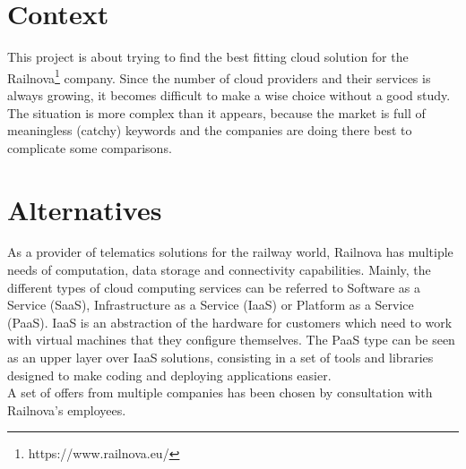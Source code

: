 \documentclass[a4paper,11pt]{article}
\begin{document}
\section{Context}
This project is about trying to find the best fitting cloud solution for the Railnova\footnote{https://www.railnova.eu/} company. Since the number of cloud providers and their services is always growing, it becomes difficult to make a wise choice without a good study. The situation is more complex than it appears, because the market is full of meaningless (catchy) keywords and the companies are doing there best to complicate some comparisons.


\section{Alternatives}
As a provider of telematics solutions for the railway world, Railnova has multiple needs of computation, data storage and connectivity capabilities. Mainly, the different types of cloud computing services can be referred to Software as a Service (SaaS), Infrastructure as a Service (IaaS) or Platform as a Service (PaaS). IaaS is an abstraction of the hardware for customers which need to work with virtual machines that they configure themselves. The PaaS type can be seen as an upper layer over IaaS solutions, consisting in a set of tools and libraries designed to make coding and deploying applications easier.\\

A set of offers from multiple companies has been chosen by consultation with Railnova's employees. 
\end{document}

